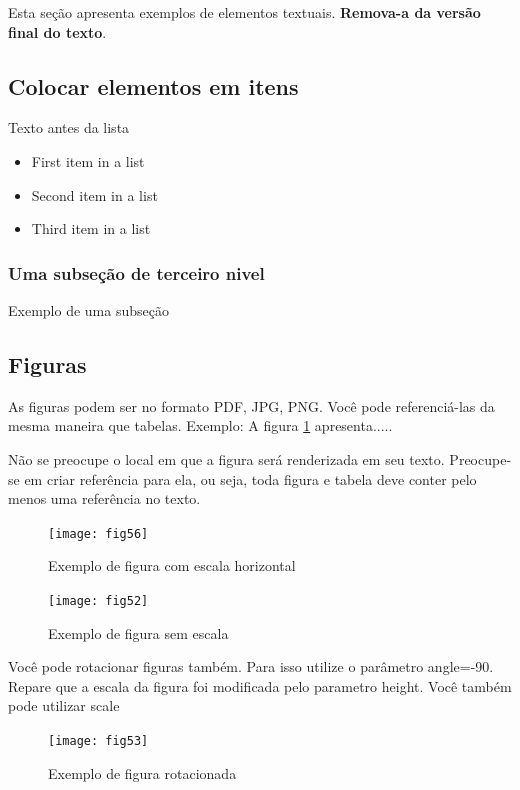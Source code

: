 \documentclass[	DIV=calc,%
paper=a4,%
fontsize=12pt,%
onecolumn]{scrartcl}	 					%
\begin{document}
	Esta seção apresenta exemplos de elementos textuais. \textbf{Remova-a da versão final do texto}.
	
	
	\subsection{Colocar elementos em itens}
	
	Texto antes da lista
	
	\begin{itemize}
		\item First item in a list 
		\item Second item in a list 
		\item Third item in a list
	\end{itemize}
	
	\subsubsection{Uma subseção de terceiro nivel}
	
	Exemplo de uma subseção
	
	
	\subsection{Figuras}
	
	As figuras podem ser no formato PDF, JPG, PNG. Você pode referenciá-las da mesma maneira que tabelas. Exemplo: A figura \ref{fig56} apresenta.....
	
	Não se preocupe o local em que a figura será renderizada em seu texto. Preocupe-se em criar referência para ela, ou seja, toda figura e tabela deve conter pelo menos uma referência no texto.
	
	\begin{figure}
		\centering
		\texttt{[image: fig56]}
		\caption{Exemplo de figura com escala horizontal}
		\label{fig56}
	\end{figure}
	
	
	\begin{figure}
		\centering
		\texttt{[image: fig52]}
		\caption{Exemplo de figura sem escala}
		\label{fig52}
	\end{figure}
	
	Você pode rotacionar figuras também. Para isso utilize o parâmetro angle=-90. Repare que a escala da figura foi modificada pelo parametro height. Você também pode utilizar scale
	
	\begin{figure}
		\centering
		\texttt{[image: fig53]}
		\caption{Exemplo de figura rotacionada}
		\label{fig53}
	\end{figure}
	
\end{document}
